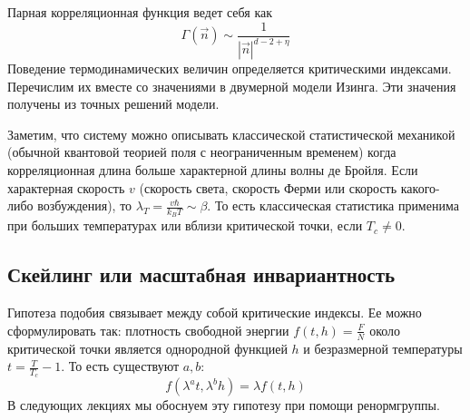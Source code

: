 \documentclass[a4paper,12pt]{article}
\theoremstyle{definition}
\theoremstyle{definition}
\theoremstyle{definition}
\begin{document}
Парная корреляционная функция ведет себя как
\begin{equation}
  \label{eq:32}
  \Gamma(\vec n)\sim \frac{1}{\left|\vec n\right|^{d-2+\eta}}
\end{equation}
Поведение термодинамических величин определяется критическими индексами. Перечислим их вместе со значениями в двумерной модели Изинга. Эти значения получены из точных решений модели.
\begin{table}[h!tb]
\label{tab:diagrams}
\noindent  {}
\end{table}

Заметим, что систему можно описывать классической статистической механикой (обычной квантовой теорией поля с неограниченным временем) когда корреляционная длина больше характерной длины волны де Бройля. Если характерная скорость $v$ (скорость света, скорость Ферми или скорость какого-либо возбуждения), то $\lambda_T=\frac{v\hbar}{k_B T}\sim \beta$. То есть классическая статистика применима при больших температурах или вблизи критической точки, если $T_c\neq 0$.

\subsection{Скейлинг или масштабная инвариантность}
\label{sec:scaling}

Гипотеза подобия связывает между собой критические индексы. Ее можно сформулировать так: плотность свободной энергии $f(t,h)=\frac{F}{N}$ около критической точки является однородной функцией $h$ и безразмерной температуры $t=\frac{T}{T_c}-1$. То есть существуют $a,b$:
\begin{equation}
  \label{eq:33}
  f(\lambda^a t,\lambda^b h)=\lambda f(t,h)
\end{equation}
В следующих лекциях мы обоснуем эту гипотезу при помощи ренормгруппы.
\end{document}
